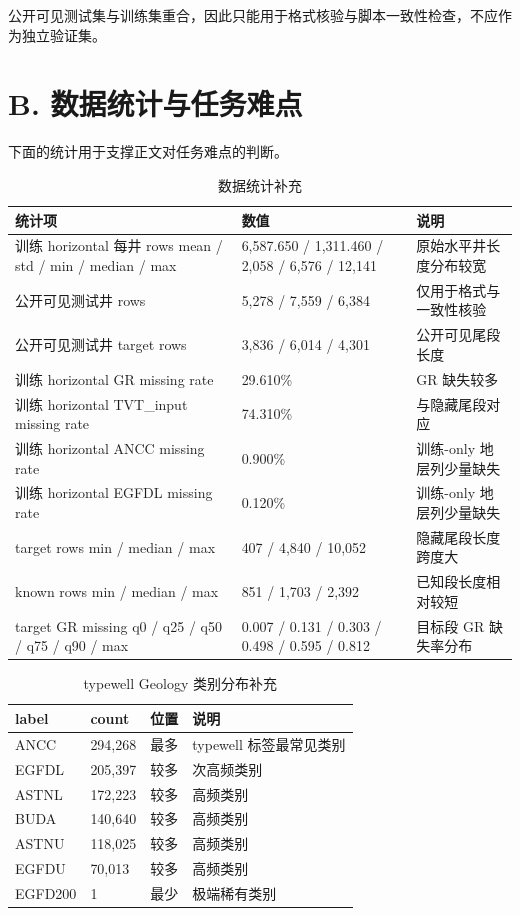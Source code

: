 \documentclass[openany]{Template_ECNU_Undergraduate_202505/ecnuundergraduate}
\newcommand{\appendixreset}[1]{%
  \setcounter{table}{0}%
  \setcounter{figure}{0}%
  \renewcommand{\thetable}{#1-\arabic{table}}%
  \renewcommand{\thefigure}{#1-\arabic{figure}}%
}
\begin{document}
\noindent 公开可见测试集与训练集重合，因此只能用于格式核验与脚本一致性检查，不应作为独立验证集。

\section*{B. 数据统计与任务难点}
\appendixreset{B}
\noindent 下面的统计用于支撑正文对任务难点的判断。

\begin{table}[H]
\centering
\small
\begin{tabularx}{0.97\textwidth}{@{}p{5.0cm}p{3.2cm}X@{}}
\toprule
统计项 & 数值 & 说明 \\
\midrule
训练 horizontal 每井 rows mean / std / min / median / max & 6,587.650 / 1,311.460 / 2,058 / 6,576 / 12,141 & 原始水平井长度分布较宽 \\
公开可见测试井 rows & 5,278 / 7,559 / 6,384 & 仅用于格式与一致性核验 \\
公开可见测试井 target rows & 3,836 / 6,014 / 4,301 & 公开可见尾段长度 \\
训练 horizontal GR missing rate & 29.610\% & GR 缺失较多 \\
训练 horizontal TVT\_input missing rate & 74.310\% & 与隐藏尾段对应 \\
训练 horizontal ANCC missing rate & 0.900\% & 训练-only 地层列少量缺失 \\
训练 horizontal EGFDL missing rate & 0.120\% & 训练-only 地层列少量缺失 \\
target rows min / median / max & 407 / 4,840 / 10,052 & 隐藏尾段长度跨度大 \\
known rows min / median / max & 851 / 1,703 / 2,392 & 已知段长度相对较短 \\
target GR missing q0 / q25 / q50 / q75 / q90 / max & 0.007 / 0.131 / 0.303 / 0.498 / 0.595 / 0.812 & 目标段 GR 缺失率分布 \\
\bottomrule
\end{tabularx}
\caption{数据统计补充}
\end{table}

\begin{table}[H]
\centering
\small
\begin{tabularx}{0.97\textwidth}{@{}p{4.8cm}p{2.4cm}p{2.4cm}X@{}}
\toprule
label & count & 位置 & 说明 \\
\midrule
ANCC & 294,268 & 最多 & typewell 标签最常见类别 \\
EGFDL & 205,397 & 较多 & 次高频类别 \\
ASTNL & 172,223 & 较多 & 高频类别 \\
BUDA & 140,640 & 较多 & 高频类别 \\
ASTNU & 118,025 & 较多 & 高频类别 \\
EGFDU & 70,013 & 较多 & 高频类别 \\
EGFD200 & 1 & 最少 & 极端稀有类别 \\
\bottomrule
\end{tabularx}
\caption{typewell Geology 类别分布补充}
\end{table}
\end{document}
